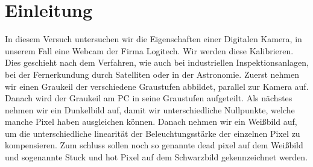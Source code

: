 \documentclass[TGAI_Laborbericht.tex]{subfiles}
\begin{document}
\chapter{Einleitung}
\label{chap:EINL}
\pagestyle{plain}

In diesem Versuch untersuchen wir die Eigenschaften einer Digitalen Kamera, in unserem Fall eine Webcam der Firma Logitech. Wir werden diese Kalibrieren. Dies geschieht nach dem Verfahren, wie auch bei industriellen Inspektionsanlagen, bei der Fernerkundung durch Satelliten oder in der Astronomie. Zuerst nehmen wir einen Graukeil der verschiedene Graustufen abbildet, parallel zur Kamera auf. Danach wird der Graukeil am PC in seine Graustufen aufgeteilt. Als nächstes nehmen wir ein Dunkelbild auf, damit wir unterschiedliche Nullpunkte, welche manche Pixel haben ausgleichen können. Danach nehmen wir ein Weißbild auf, um die unterschiedliche linearität der Beleuchtungsstärke der einzelnen Pixel zu kompensieren. Zum schluss sollen noch so genannte dead pixel auf dem Weißbild und sogenannte Stuck und hot Pixel auf dem Schwarzbild gekennzeichnet werden.
\end{document}
